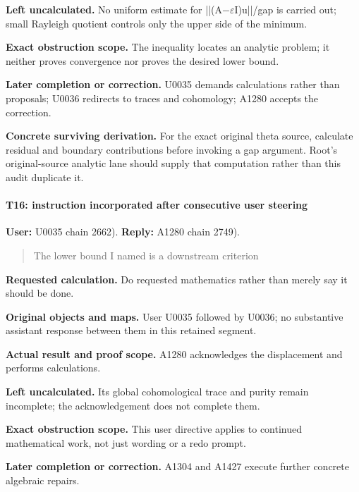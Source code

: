 \textbf{Left uncalculated.} No uniform estimate for
||(A\allowbreak{}\ensuremath{−}\allowbreak{}\allowbreak{}\ensuremath{ε}\allowbreak{}I)u||/gap
is carried out; small Rayleigh quotient controls only the upper side of
the minimum.

\textbf{Exact obstruction scope.} The inequality locates an analytic
problem; it neither proves convergence nor proves the desired lower
bound.

\textbf{Later completion or correction.} U0035 demands calculations
rather than proposals; U0036 redirects to traces and cohomology; A1280
accepts the correction.

\textbf{Concrete surviving derivation.} For the exact original theta
source, calculate residual and boundary contributions before invoking a
gap argument. Root's original-source analytic lane should supply that
computation rather than this audit duplicate it.

\paragraph{T16: instruction incorporated after consecutive user
steering}\label{t16-instruction-incorporated-after-consecutive-user-steering}

\textbf{User:} U0035
\protect{} chain 2662).
\textbf{Reply:} A1280
\protect{} chain 2749).

\begin{quote}
The lower bound I named is a downstream criterion
\end{quote}

\textbf{Requested calculation.} Do requested mathematics rather than
merely say it should be done.

\textbf{Original objects and maps.} User U0035 followed by U0036; no
substantive assistant response between them in this retained segment.

\textbf{Actual result and proof scope.} A1280 acknowledges the
displacement and performs
\protect{}
calculations.

\textbf{Left uncalculated.} Its global cohomological trace and purity
remain incomplete; the acknowledgement does not complete them.

\textbf{Exact obstruction scope.} This user directive applies to
continued mathematical work, not just wording or a redo prompt.

\textbf{Later completion or correction.} A1304 and A1427 execute further
concrete algebraic repairs.

